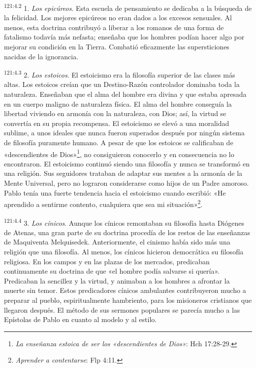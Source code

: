 \par
\textsuperscript{121:4.2} 1. \textit{Los epicúreos}. Esta escuela de pensamiento se dedicaba a la búsqueda de la felicidad. Los mejores epicúreos no eran dados a los excesos sensuales. Al menos, esta doctrina contribuyó a liberar a los romanos de una forma de fatalismo todavía más nefasta; enseñaba que los hombres podían hacer algo por mejorar su condición en la Tierra. Combatió eficazmente las supersticiones nacidas de la ignorancia.

\par
\textsuperscript{121:4.3} 2. \textit{Los estoicos}. El estoicismo era la filosofía superior de las clases más altas. Los estoicos creían que un Destino-Razón controlador dominaba toda la naturaleza. Enseñaban que el alma del hombre era divina y que estaba apresada en un cuerpo maligno de naturaleza física. El alma del hombre conseguía la libertad viviendo en armonía con la naturaleza, con Dios; así, la virtud se convertía en su propia recompensa. El estoicismo se elevó a una moralidad sublime, a unos ideales que nunca fueron superados después por ningún sistema de filosofía puramente humano. A pesar de que los estoicos se calificaban de «descendientes de Dios»\footnote{\textit{La enseñanza estoica de ser los «descendientes de Dios»}: Hch 17:28-29.}, no consiguieron conocerlo y en consecuencia no lo encontraron. El estoicismo continuó siendo una filosofía y nunca se transformó en una religión. Sus seguidores trataban de adaptar sus mentes a la armonía de la Mente Universal, pero no lograron considerarse como hijos de un Padre amoroso. Pablo tenía una fuerte tendencia hacia el estoicismo cuando escribió: «He aprendido a sentirme contento, cualquiera que sea mi situación»\footnote{\textit{Aprender a contentarse}: Flp 4:11.}.

\par
\textsuperscript{121:4.4} 3. \textit{Los cínicos}. Aunque los cínicos remontaban su filosofía hasta Diógenes de Atenas, una gran parte de su doctrina procedía de los restos de las enseñanzas de Maquiventa Melquisedek. Anteriormente, el cinismo había sido más una religión que una filosofía. Al menos, los cínicos hicieron democrática su filosofía religiosa. En los campos y en las plazas de los mercados, predicaban continuamente su doctrina de que «el hombre podía salvarse si quería». Predicaban la sencillez y la virtud, y animaban a los hombres a afrontar la muerte sin temor. Estos predicadores cínicos ambulantes contribuyeron mucho a preparar al pueblo, espiritualmente hambriento, para los misioneros cristianos que llegaron después. El método de sus sermones populares se parecía mucho a las Epístolas de Pablo en cuanto al modelo y al estilo.

